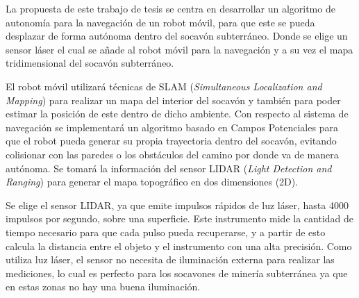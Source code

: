 

La propuesta de este trabajo de tesis se centra en desarrollar un algoritmo de autonomía para la navegación de un robot móvil, para que este se pueda desplazar de forma autónoma dentro del socavón subterráneo. Donde se elige un sensor láser el cual se añade al robot móvil para la navegación y a su vez el mapa tridimensional del socavón subterráneo.

El robot móvil utilizará técnicas de SLAM (\textit{Simultaneous Localization and Mapping}) para realizar un mapa del interior del socavón y también para poder estimar la posición de este dentro de dicho ambiente. Con respecto al sistema de navegación se implementará un algoritmo basado en Campos Potenciales para que el robot pueda generar su propia trayectoria dentro del socavón, evitando colisionar con las paredes o los obstáculos del camino por donde va de manera autónoma. Se tomará la información del sensor LIDAR (\textit{Light Detection and Ranging}) para generar el mapa topográfico en dos dimensiones (2D).

Se elige el sensor LIDAR, ya que emite impulsos rápidos de luz láser, hasta 4000 impulsos por segundo, sobre una superficie. Este instrumento mide la cantidad de tiempo necesario para que cada pulso pueda recuperarse, y a partir de esto calcula la distancia entre el objeto y el instrumento con una alta precisión. Como utiliza luz láser, el sensor no necesita de iluminación externa para realizar las mediciones, lo cual es perfecto para los socavones de minería subterránea ya que en estas zonas no hay una buena iluminación. 


